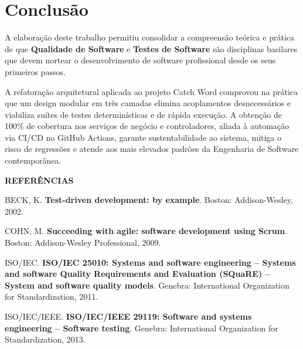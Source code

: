 \documentclass[12pt,a4paper]{article}
\begin{document}
\section{Conclusão}

A elaboração deste trabalho permitiu consolidar a compreensão teórica e prática de que \textbf{Qualidade de Software} e \textbf{Testes de Software} são disciplinas basilares que devem nortear o desenvolvimento de software profissional desde os seus primeiros passos.

A refatoração arquitetural aplicada ao projeto Catch Word comprovou na prática que um design modular em três camadas elimina acoplamentos desnecessários e viabiliza suítes de testes determinísticas e de rápida execução. A obtenção de 100\% de cobertura nos serviços de negócio e controladores, aliada à automação via CI/CD no GitHub Actions, garante sustentabilidade ao sistema, mitiga o risco de regressões e atende aos mais elevados padrões da Engenharia de Software contemporânea.

\newpage
\begin{center}
    \textbf{\MakeUppercase{Referências}}
\end{center}
\vspace{0.4cm}

\noindent BECK, K. \textbf{Test-driven development: by example}. Boston: Addison-Wesley, 2002.

\vspace{0.3cm}
\noindent COHN, M. \textbf{Succeeding with agile: software development using Scrum}. Boston: Addison-Wesley Professional, 2009.

\vspace{0.3cm}
\noindent ISO/IEC. \textbf{ISO/IEC 25010: Systems and software engineering -- Systems and software Quality Requirements and Evaluation (SQuaRE) -- System and software quality models}. Genebra: International Organization for Standardization, 2011.

\vspace{0.3cm}
\noindent ISO/IEC/IEEE. \textbf{ISO/IEC/IEEE 29119: Software and systems engineering -- Software testing}. Genebra: International Organization for Standardization, 2013.
\end{document}
